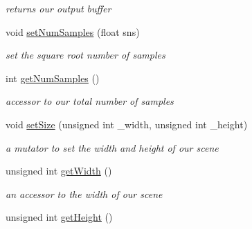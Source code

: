 \begin{DoxyCompactItemize}
\begin{DoxyCompactList}\small\item\em returns our output buffer \end{DoxyCompactList}\item 
\hypertarget{class_path_tracer_scene_a89903d6abd08922f30a65282283cb1f9}{void \hyperlink{class_path_tracer_scene_a89903d6abd08922f30a65282283cb1f9}{set\-Num\-Samples} (float sns)}\label{class_path_tracer_scene_a89903d6abd08922f30a65282283cb1f9}

\begin{DoxyCompactList}\small\item\em set the square root number of samples \end{DoxyCompactList}\item 
\hypertarget{class_path_tracer_scene_af35baf9498a6c8300011ff6ed5d4da01}{int \hyperlink{class_path_tracer_scene_af35baf9498a6c8300011ff6ed5d4da01}{get\-Num\-Samples} ()}\label{class_path_tracer_scene_af35baf9498a6c8300011ff6ed5d4da01}

\begin{DoxyCompactList}\small\item\em accessor to our total number of samples \end{DoxyCompactList}\item 
\hypertarget{class_path_tracer_scene_a3c2ffc8299ecfa8b2cd3170c0eb739b6}{void \hyperlink{class_path_tracer_scene_a3c2ffc8299ecfa8b2cd3170c0eb739b6}{set\-Size} (unsigned int \-\_\-width, unsigned int \-\_\-height)}\label{class_path_tracer_scene_a3c2ffc8299ecfa8b2cd3170c0eb739b6}

\begin{DoxyCompactList}\small\item\em a mutator to set the width and height of our scene \end{DoxyCompactList}\item 
\hypertarget{class_path_tracer_scene_a254d52b95e947cf9985fae1ab8b7aef3}{unsigned int \hyperlink{class_path_tracer_scene_a254d52b95e947cf9985fae1ab8b7aef3}{get\-Width} ()}\label{class_path_tracer_scene_a254d52b95e947cf9985fae1ab8b7aef3}

\begin{DoxyCompactList}\small\item\em an accessor to the width of our scene \end{DoxyCompactList}\item 
\hypertarget{class_path_tracer_scene_a4721b0624e32486504128357bbcd9be9}{unsigned int \hyperlink{class_path_tracer_scene_a4721b0624e32486504128357bbcd9be9}{get\-Height} ()}\label{class_path_tracer_scene_a4721b0624e32486504128357bbcd9be9}


\end{DoxyCompactItemize}
